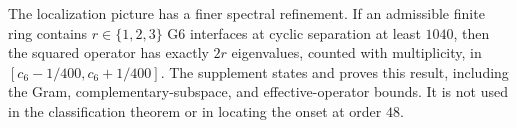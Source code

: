 \begin{remark}
The localization picture has a finer spectral refinement. If an admissible
finite ring contains \(r\in\{1,2,3\}\) G6 interfaces at cyclic separation
at least \(1040\), then the squared operator has exactly \(2r\) eigenvalues,
counted with multiplicity, in
\([c_6-1/400,c_6+1/400]\). The supplement states and proves this result,
including the Gram, complementary-subspace, and effective-operator bounds.
It is not used in the classification theorem or in locating the onset at
order \(48\).
\end{remark}
